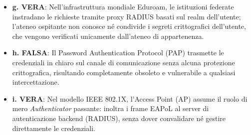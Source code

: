 \documentclass[11pt,a4paper]{article}
\begin{document}
\begin{solutionbox}
\begin{itemize}
    \item \textbf{g. VERA}: Nell'infrastruttura mondiale Eduroam, le istituzioni federate instradano le richieste tramite proxy RADIUS basati sul realm dell'utente; l'ateneo ospitante non conosce n\'e condivide i segreti crittografici dell'utente, che vengono verificati unicamente dall'ateneo di appartenenza.
    \item \textbf{h. FALSA}: Il Password Authentication Protocol (PAP) trasmette le credenziali in chiaro sul canale di comunicazione senza alcuna protezione crittografica, risultando completamente obsoleto e vulnerabile a qualsiasi intercettazione.
    \item \textbf{i. VERA}: Nel modello IEEE 802.1X, l'Access Point (AP) assume il ruolo di mero \textit{Authenticator} passante: inoltra i frame EAPoL al server di autenticazione backend (RADIUS), senza dover convalidare n\'e gestire direttamente le credenziali.
\end{itemize}


\end{solutionbox}
\end{document}
